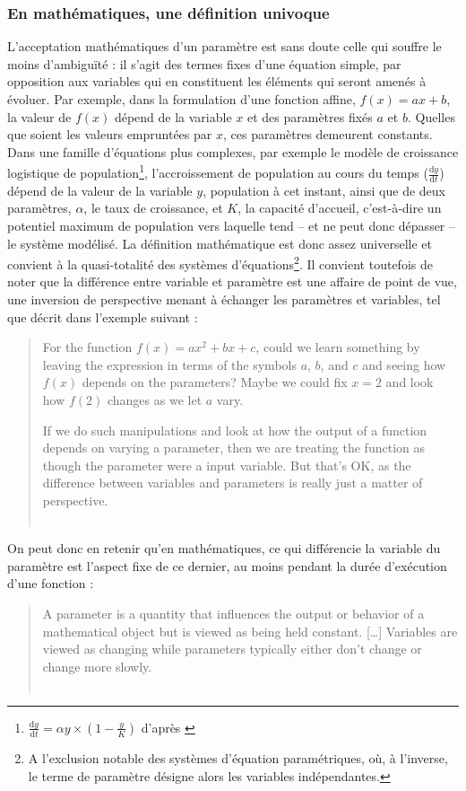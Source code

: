 \documentclass[12pt, a4paper, oneside]{book}
\begin{document}
	\subsubsection{En mathématiques, une définition univoque}
	L'acceptation mathématiques d'un paramètre est sans doute celle qui souffre le moins d'ambiguïté : il s'agit des termes fixes d'une équation simple, par opposition aux variables qui en constituent les éléments qui seront amenés à évoluer.
	Par exemple, dans la formulation d'une fonction affine, $f(x) = ax + b$, la valeur de $f(x)$ dépend de la variable $x$ et des paramètres fixés $a$ et $b$.
	Quelles que soient les valeurs empruntées par $x$, ces paramètres demeurent constants. Dans une famille d'équations plus complexes, par exemple le modèle de croissance logistique de population\footnote{
		$\frac{\text{d}y}{\text{d}t} = \alpha y \times (1 - \frac{y}{K})$ d'après \autocite{verhulst1838notice}
	}, l'accroissement de population au cours du temps ($\frac{\text{d}y}{\text{d}t}$) dépend de la valeur de la variable $y$, population à cet instant, ainsi que de deux paramètres, $\alpha$, le taux de croissance, et $K$, la \og capacité d'accueil\fg{}, c'est-à-dire un potentiel maximum de population vers laquelle tend -- et ne peut donc dépasser -- le système modélisé.
	La définition mathématique est donc assez universelle et convient à la quasi-totalité des systèmes d'équations\footnote{A l'exclusion notable des systèmes d'équation paramétriques, où, à l'inverse, le terme de paramètre désigne alors les variables indépendantes.}.
	Il convient toutefois de noter que la différence entre variable et paramètre est une affaire de point de vue, une inversion de perspective menant à échanger les paramètres et variables, tel que décrit dans l'exemple suivant :
	\begin{quote}
		\og For the function $f(x)=ax^2+bx+c$, could we learn something by leaving the expression in terms of the symbols $a$, $b$, and $c$ and seeing how $f(x)$ depends on the parameters? Maybe we could fix $x=2$ and look how $f(2)$ changes as we let $a$ vary.
		
		If we do such manipulations and look at how the output of a function depends on varying a parameter, then we are treating the function as though the parameter were a input variable. But that's OK, as the difference between variables and parameters is really just a matter of perspective.\fg{}\\
		\mbox{}~ \hfill \autocite{nykamp_function_2015}
	\end{quote}
	On peut donc en retenir qu'en mathématiques, ce qui différencie la variable du paramètre est l'aspect fixe de ce dernier, au moins pendant la durée d'exécution d'une fonction : 
	\begin{quote}
	\og{}A parameter is a quantity that influences the output or behavior of a mathematical object but is viewed as being held constant. [\dots]
	Variables are viewed as changing while parameters typically either don't change or change more slowly.\fg{}\\
		\mbox{}~ \hfill \autocite{nykamp_parameter_2015}
	\end{quote}
\end{document}
